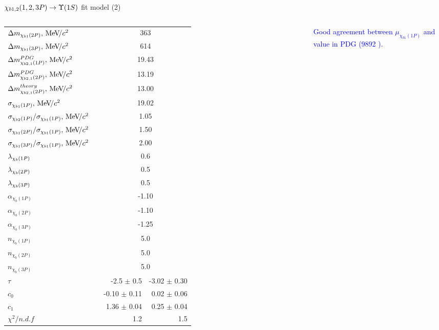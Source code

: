 \begin{frame}{$\chi_{b1,2}(1,2,3P) \to \OneS$ fit model (2)}
\begin{columns}[T]
{\begin{tabular}{lrrr}
    $\Delta m_{\chi_{b 1}(2P)}, {\mathrm{\,Me\kern -0.1em V\!/}c^2}$  && \multicolumn{2}{c}{363} \\
    $\Delta m_{\chi_{b 1}(3P)}, {\mathrm{\,Me\kern -0.1em V\!/}c^2}$  && \multicolumn{2}{c}{614} \\

    \rule{0pt}{4ex}$\Delta m_{\chi_{b2,1}(1P)}^{PDG}, {\mathrm{\,Me\kern -0.1em V\!/}c^2}$  && \multicolumn{2}{c}{19.43} \\
    $\Delta m_{\chi_{b2,1}(2P)}^{PDG}, {\mathrm{\,Me\kern -0.1em V\!/}c^2}$  && \multicolumn{2}{c}{13.19} \\
    $\Delta m_{\chi_{b2,1}(2P)}^{theory}, {\mathrm{\,Me\kern -0.1em V\!/}c^2}$  && \multicolumn{2}{c}{13.00} \\

    \rule{0pt}{4ex}$\sigma_{\chi_{b1}(1P)}, {\mathrm{\,Me\kern -0.1em V\!/}c^2}$  && \multicolumn{2}{c}{19.02} \\
    $\sigma_{\chi_{b2}(1P)}/\sigma_{\chi_{b1}(1P)}, {\mathrm{\,Me\kern -0.1em V\!/}c^2}$  && \multicolumn{2}{c}{1.05} \\
    $\sigma_{\chi_{b1}(2P)} / \sigma_{\chi_{b1}(1P)}, {\mathrm{\,Me\kern -0.1em V\!/}c^2}$  && \multicolumn{2}{c}{1.50} \\
    $\sigma_{\chi_{b1}(3P)} / \sigma_{\chi_{b1}(1P)}, {\mathrm{\,Me\kern -0.1em V\!/}c^2}$  && \multicolumn{2}{c}{2.00} \\

    \rule{0pt}{4ex}$\lambda_{\chi_{b}(1P)}$  && \multicolumn{2}{c}{0.6} \\
    $\lambda_{\chi_{b}(2P)}$  && \multicolumn{2}{c}{0.5} \\
    $\lambda_{\chi_{b}(3P)}$  && \multicolumn{2}{c}{0.5} \\

    \rule{0pt}{4ex}$\alpha_{\chi_{b}(1P)}$  && \multicolumn{2}{c}{-1.10} \\
    $\alpha_{\chi_{b}(2P)}$  && \multicolumn{2}{c}{-1.10} \\
    $\alpha_{\chi_{b}(3P)}$  && \multicolumn{2}{c}{-1.25} \\

    \rule{0pt}{4ex}$n_{\chi_{b}(1P)}$  && \multicolumn{2}{c}{5.0} \\
    $n_{\chi_{b}(2P)}$  && \multicolumn{2}{c}{5.0} \\
    $n_{\chi_{b}(3P)}$  && \multicolumn{2}{c}{5.0} \\

    \rule{0pt}{4ex}$\tau$  && -2.5 $\pm$ 0.5 & -3.02 $\pm$ 0.30 \\
    $c_0$  && -0.10 $\pm$ 0.11 & 0.02 $\pm$ 0.06 \\
    $c_1$  && 1.36 $\pm$ 0.04 & 0.25 $\pm$ 0.04 \\


    \rule{0pt}{4ex}$\chi^2 / n.d.f$  && 1.2 & 1.5 \\
    \bottomrule
\end{tabular}
}

\bigskip
{\tiny \textcolor{blue}{Good agreement between $\mu_{\chi_{b1}(1P)}$ and value  in PDG (9892 \mevcc).}}
\end{columns}


\end{frame}
